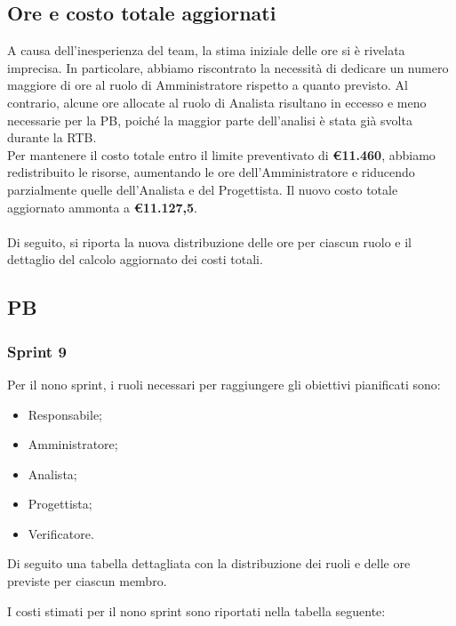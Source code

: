 \subsection{Ore e costo totale aggiornati}  
A causa dell’inesperienza del team, la stima iniziale delle ore si è rivelata imprecisa. In particolare, abbiamo riscontrato la necessità di dedicare un numero maggiore di ore al ruolo di Amministratore rispetto a quanto previsto. Al contrario, alcune ore allocate al ruolo di Analista risultano in eccesso e meno necessarie per la PB, poiché la maggior parte dell'analisi è stata già svolta durante la RTB.\\  
Per mantenere il costo totale entro il limite preventivato di \textbf{\euro 11.460}, abbiamo redistribuito le risorse, aumentando le ore dell’Amministratore e riducendo parzialmente quelle dell’Analista e del Progettista. Il nuovo costo totale aggiornato ammonta a \textbf{\euro 11.127,5}.  
\\\\
Di seguito, si riporta la nuova distribuzione delle ore per ciascun ruolo e il dettaglio del calcolo aggiornato dei costi totali.




\pagebreak
\subsection{PB}

\subsubsection{Sprint 9}
Per il nono sprint, i ruoli necessari per raggiungere gli obiettivi
pianificati sono:
\begin{itemize}
    \item Responsabile;
    \item Amministratore;
    \item Analista;
    \item Progettista;
    \item Verificatore.
\end{itemize}

Di seguito una tabella dettagliata con la distribuzione dei ruoli e delle ore previste per ciascun membro.



I costi stimati per il nono sprint sono riportati nella tabella seguente:

